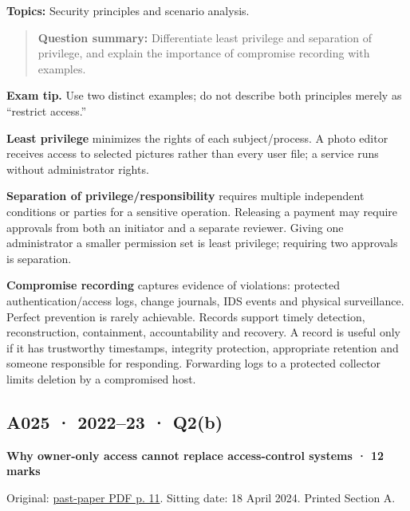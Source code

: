 \documentclass[11pt,a4paper]{article}
\begin{document}
\textbf{Topics:} Security principles and scenario analysis.



\begin{quote}\small

\textbf{Question summary:} Differentiate least privilege and separation of privilege,\allowbreak{} and explain the importance of compromise recording with examples.



\end{quote}


{\color{ForestGreen}\textbf{Exam tip.} Use two distinct examples; do not describe both principles merely as “restrict access.”}


\textbf{Least privilege} minimizes the rights of each subject/\allowbreak{}process. A photo editor receives access to selected pictures rather than every user file; a service runs without administrator rights.


\textbf{Separation of privilege/\allowbreak{}responsibility} requires multiple independent conditions or parties for a sensitive operation. Releasing a payment may require approvals from both an initiator and a separate reviewer. Giving one administrator a smaller permission set is least privilege; requiring two approvals is separation.


\textbf{Compromise recording} captures evidence of violations: protected authentication/\allowbreak{}access logs,\allowbreak{} change journals,\allowbreak{} IDS events and physical surveillance. Perfect prevention is rarely achievable. Records support timely detection,\allowbreak{} reconstruction,\allowbreak{} containment,\allowbreak{} accountability and recovery. A record is useful only if it has trustworthy timestamps,\allowbreak{} integrity protection,\allowbreak{} appropriate retention and someone responsible for responding. Forwarding logs to a protected collector limits deletion by a compromised host.




\clearpage
\subsection{A025 · 2022–23 · Q2(b)}\label{a025}

\textbf{Why owner-only access cannot replace access-control systems · 12 marks}


Original: \href{../../CSE405-Security_Merged.pdf\#page=11}{past-paper PDF p. 11}. Sitting date: 18 April 2024. Printed Section A.
\end{document}
